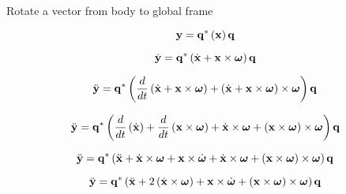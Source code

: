
Rotate a vector from body to global frame

\[
\mathbf{y} = \mathbf{q}^* \left( \mathbf{x} \right) \mathbf{q}
\]

\[
\dot{\mathbf{y}} = \mathbf{q}^* \left( \dot{\mathbf{x}} + \mathbf{x} \times \boldsymbol \omega \right) \mathbf{q}
\]

\[
\ddot{\mathbf{y}} = \mathbf{q}^* \left( \frac{d}{dt} \left( \dot{\mathbf{x}} + \mathbf{x} \times \boldsymbol \omega \right) + \left(\dot{\mathbf{x}} + \mathbf{x} \times \boldsymbol \omega \right) \times \boldsymbol \omega \right) \mathbf{q}
\]

\[
\ddot{\mathbf{y}} = \mathbf{q}^* \left(
\frac{d}{dt} \left( \dot{\mathbf{x}} \right) +
\frac{d}{dt} \left( \mathbf{x} \times \boldsymbol \omega \right) +
\dot{\mathbf{x}} \times \boldsymbol \omega +
\left(\mathbf{x} \times \boldsymbol \omega \right) \times \boldsymbol \omega
\right) \mathbf{q}
\]

\[
\ddot{\mathbf{y}} = \mathbf{q}^* \left(
\ddot{\mathbf{x}} +
\dot{\mathbf{x}} \times \boldsymbol \omega +
\mathbf{x} \times \dot{\boldsymbol \omega} +
\dot{\mathbf{x}} \times \boldsymbol \omega +
\left(\mathbf{x} \times \boldsymbol \omega \right) \times \boldsymbol \omega
\right) \mathbf{q}
\]

\[
\ddot{\mathbf{y}} = \mathbf{q}^* \left(
\ddot{\mathbf{x}} +
2 \left( \dot{\mathbf{x}} \times \boldsymbol \omega \right) +
\mathbf{x} \times \dot{\boldsymbol \omega} +
\left(\mathbf{x} \times \boldsymbol \omega \right) \times \boldsymbol \omega
\right) \mathbf{q}
\]

